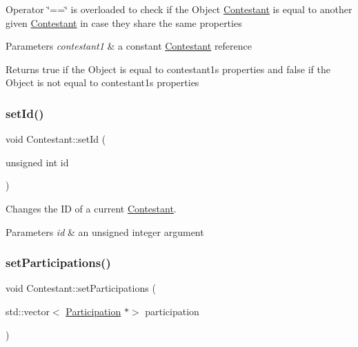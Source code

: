 Operator \char`\"{}==\char`\"{} is overloaded to check if the Object \hyperlink{class_contestant}{Contestant} is equal to another given \hyperlink{class_contestant}{Contestant} in case they share the same properties 
\begin{DoxyParams}{Parameters}
{\em contestant1} & a constant \hyperlink{class_contestant}{Contestant} reference \\
\hline
\end{DoxyParams}
\begin{DoxyReturn}{Returns}
true if the Object is equal to contestant1\textquotesingle{}s properties and false if the Object is not equal to contestant1\textquotesingle{}s properties 
\end{DoxyReturn}
\mbox{\label{class_contestant_add8973daf90279756d9ba846dcbffa67}} 
\subsubsection{\texorpdfstring{set\+Id()}{setId()}}
{\footnotesize\ttfamily void Contestant\+::set\+Id (\begin{DoxyParamCaption}\item[{unsigned int}]{id }\end{DoxyParamCaption})}



Changes the ID of a current \hyperlink{class_contestant}{Contestant}. 


\begin{DoxyParams}{Parameters}
{\em id} & an unsigned integer argument \\
\hline
\end{DoxyParams}
\mbox{\label{class_contestant_a0ca184f1d5064ad78e7b5f643c8e4f42}} 
\subsubsection{\texorpdfstring{set\+Participations()}{setParticipations()}}
{\footnotesize\ttfamily void Contestant\+::set\+Participations (\begin{DoxyParamCaption}\item[{std\+::vector$<$ \hyperlink{class_participation}{Participation} $\ast$$>$}]{participation }\end{DoxyParamCaption})}



